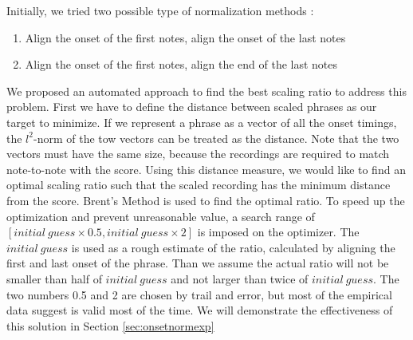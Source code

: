 
   Initially, we tried two possible type of normalization methods : 
   \begin{enumerate}
      \item Align the onset of the first notes, align the onset of the last notes
      \item Align the onset of the first notes, align the end of the last notes
   \end{enumerate}
   We proposed an automated approach to find the best scaling ratio to address this problem. First we have to define the distance between scaled phrases as our target to minimize. If we represent a phrase as a vector of all the onset timings, the $l^2$-norm of the tow vectors can be treated as the distance. Note that the two vectors must have the same size, because the recordings are required to match note-to-note with the score. Using this distance measure, we would like to find an optimal scaling ratio such that the scaled recording has the minimum distance from the score. Brent's Method\cite{brent1973} is used to find the optimal ratio. To speed up the optimization and prevent unreasonable value, a search range of $[initial\ guess \times 0.5 , initial\ guess \times 2]$ is imposed on the optimizer. The $initial\ guess$ is used as a rough estimate of the ratio, calculated by aligning the first and last onset of the phrase. Than we assume the actual ratio will not be smaller than half of $initial\ guess$ and not larger than twice of $initial\ guess$. The two numbers 0.5 and 2 are chosen by trail and error, but most of the empirical data suggest is valid most of the time. We will demonstrate the effectiveness of this solution in Section \ref{sec:onsetnormexp}
